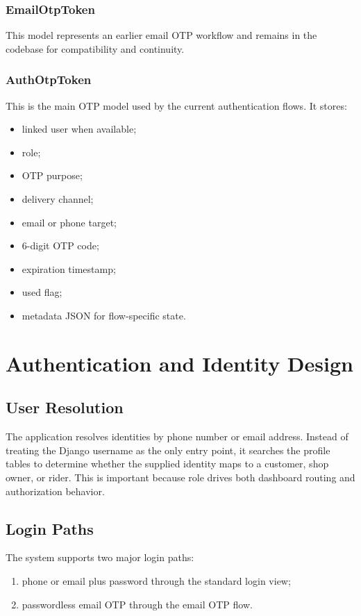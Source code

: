\documentclass[12pt,a4paper]{article}
\begin{document}
\subsubsection{EmailOtpToken}
This model represents an earlier email OTP workflow and remains in the codebase for compatibility and continuity.

\subsubsection{AuthOtpToken}
This is the main OTP model used by the current authentication flows. It stores:
\begin{itemize}[leftmargin=1.5em]
    \item linked user when available;
    \item role;
    \item OTP purpose;
    \item delivery channel;
    \item email or phone target;
    \item 6-digit OTP code;
    \item expiration timestamp;
    \item used flag;
    \item metadata JSON for flow-specific state.
\end{itemize}

\section{Authentication and Identity Design}
\subsection{User Resolution}
The application resolves identities by phone number or email address. Instead of treating the Django username as the only entry point, it searches the profile tables to determine whether the supplied identity maps to a customer, shop owner, or rider. This is important because role drives both dashboard routing and authorization behavior.

\subsection{Login Paths}
The system supports two major login paths:
\begin{enumerate}[leftmargin=1.5em]
    \item phone or email plus password through the standard login view;
    \item passwordless email OTP through the email OTP flow.
\end{enumerate}
\end{document}
